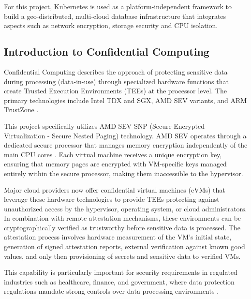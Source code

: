 For this project, Kubernetes is used as a platform-independent framework to build a geo-distributed, multi-cloud database infrastructure that integrates aspects such as network encryption, storage security and CPU isolation.

\subsection{Introduction to Confidential Computing}

Confidential Computing describes the approach of protecting sensitive data during processing (data-in-use) through specialized hardware functions that create Trusted Execution Environments (TEEs) at the processor level. The primary technologies include Intel TDX and SGX, AMD SEV variants, and ARM TrustZone \parencite{confidential_computing_consortium_2024}.

This project specifically utilizes AMD SEV-SNP (Secure Encrypted Virtualization - Secure Nested Paging) technology. AMD SEV operates through a dedicated secure processor that manages memory encryption independently of the main CPU cores \parencite{amd_sev_2024, kaplan_amd_encryption_2016}. Each virtual machine receives a unique encryption key, ensuring that memory pages are encrypted with VM-specific keys managed entirely within the secure processor, making them inaccessible to the hypervisor.

Major cloud providers now offer confidential virtual machines (cVMs) that leverage these hardware technologies to provide TEEs protecting against unauthorized access by the hypervisor, operating system, or cloud administrators. In combination with remote attestation mechanisms, these environments can be cryptographically verified as trustworthy before sensitive data is processed. The attestation process involves hardware measurement of the VM's initial state, generation of signed attestation reports, external verification against known good values, and only then provisioning of secrets and sensitive data to verified VMs.

This capability is particularly important for security requirements in regulated industries such as healthcare, finance, and government, where data protection regulations mandate strong controls over data processing environments \parencite{confidential_computing_consortium_2024}.

